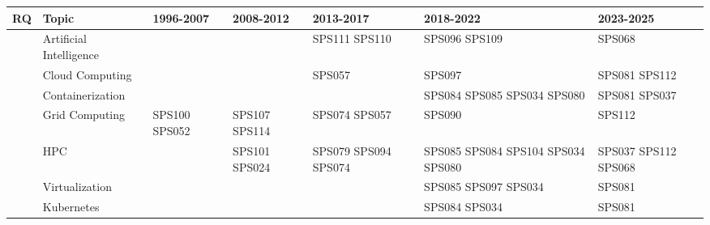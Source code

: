 \begin{table}
	{\fontsize{7}{10}\selectfont
		\setlength{\tabcolsep}{3pt}
		\begin{tabular}{>{\raggedright\arraybackslash}p{0.7cm}>{\raggedright\arraybackslash}p{2.5cm}>{\raggedright\arraybackslash}p{2.5cm}>{\raggedright\arraybackslash}p{2.5cm}>{\raggedright\arraybackslash}p{2.5cm}>{\raggedright\arraybackslash}p{2.5cm}>{\raggedright\arraybackslash}p{2.5cm}}
			\toprule
			\textbf{RQ}                    & \textbf{Topic}          & \textbf{1996-2007} & \textbf{2008-2012}   & \textbf{2013-2017}          & \textbf{2018-2022}                               & \textbf{2023-2025}          \\
			\midrule
			\multirow{18}{*}{\textbf{RQ1}} & Artificial Intelligence &                    &                      & SPS111 SPS110               & SPS096 SPS109                                    & SPS068                      \\
			                               & Cloud Computing         &                    &                      & SPS057                      & SPS097                                           & SPS081 SPS112               \\
			                               & Containerization        &                    &                      &                             & SPS084 SPS085 SPS034 SPS080                      & SPS081 SPS037               \\
			                               & Grid Computing          & SPS100 SPS052      & SPS107 SPS114        & SPS074 SPS057               & SPS090                                           & SPS112                      \\
			                               & HPC                     &                    & SPS101 SPS024        & SPS079 SPS094 SPS074              & SPS085 SPS084 SPS104 SPS034 SPS080               & SPS037 SPS112 SPS068        \\
			                               & Virtualization          &                    &                      &                             & SPS085 SPS097 SPS034                             & SPS081                      \\
			                               & Kubernetes              &                    &                      &                             & SPS084 SPS034                                    & SPS081                      \\

\end{tabular}}
\end{table}
